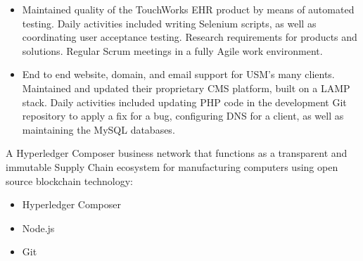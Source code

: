 \documentclass[10pt,a4paper]{altacv}
\begin{document}
\divider

\begin{itemize}
\item Maintained quality of the TouchWorks EHR product by means of automated testing.
Daily activities included writing Selenium scripts, as well as coordinating user
acceptance testing. Research requirements for products and solutions. Regular
Scrum meetings in a fully Agile work environment.
\end{itemize}

\divider

\begin{itemize}
\item End to end website, domain, and email support for USM's many clients. Maintained and
updated their proprietary CMS platform, built on a LAMP stack. Daily activities included
updating PHP code in the development Git repository to apply a fix for a bug, configuring DNS for a
client, as well as maintaining the MySQL databases.
\end{itemize}


A Hyperledger Composer business network that functions as a transparent and immutable Supply Chain
ecosystem for manufacturing computers using open source blockchain technology:
\smallskip
\begin{itemize}
\item Hyperledger Composer
\item Node.js
\item Git
\end{itemize}

\medskip

% 

\end{document}
